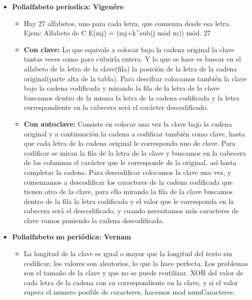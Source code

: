 \documentclass[12pt, twoside, openright]{report} %
\begin{document}
\begin{itemize}
\begin{itemize}
\begin{itemize}
      \end{itemize}
    \item \textbf{Polialfabeto periodica: Vigenére}
      

      \begin{itemize}
      \item Hay 27 alfabetos, uno para cada letra, que comienza desde esa
        letra. Ejem: Alfabeto de C E(mj) = (mj+k\^{}sub(j mód m)) mód.
        27
        
      \item \textbf{Con clave:} Lo que equivale a colocar bajo la cadena
        original la clave tantas veces como para cubrirla entera. Y lo
        que se hace es buscar en el alfabeto de la letra de la
        clave(fila) la posición de la letra de la cadena original(parte
        alta de la tabla). Para descifrar colocamos también la clave
        bajo la cadena codificada y mirando la fila de la letra de la
        clave buscamos dentro de la misma la letra de la cadena
        codificada y la letra correspondiente en la cabecera será el
        carácter descodificado.
        
      \item \textbf{Con autoclave:} Consiste en colocar una vez la clave
        bajo la cadena original y a continuación la cadena a codificar
        también como clave, hasta que cada letra de la cadena original
        le corresponda uno de clave. Para codificar se miran la fila de
        la letra de la clave y buscamos en la cabecera de las columnas
        el carácter que le corresponde de la original, así hasta
        completar la cadena. Para descodificar colocamos la clave una
        vez, y comenzamos a descodificar los caracteres de la cadena
        codificada que tienen otro de la clave, para ello mirando la
        fila de la clave buscamos dentro de la fila la letra codificada
        y el valor que le corresponda en la cabecera será el
        descodificado, y cuando necesitamos más caracteres de clave
        vamos poniendo la cadena descodificada.
        
      \end{itemize}
    \item \textbf{Polialfabeto no periódica: Vernam}
      

      \begin{itemize}
      \item La longitud de la clave es igual o mayor que la longitud del
        texto sin codificar, los valores son aleatorios, lo que la hace
        perfecta. Los problemas son el tamaño de la clave y que no se
        puede reutilizar. XOR del valor de cada letra de la cadena con
        su correspondiente en la clave, y si el valor supera el numero
        posible de caracteres, hacemos mod numCaracteres.
        

\end{itemize}
\end{itemize}
\end{itemize}
\end{document}
